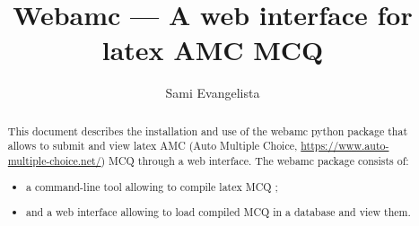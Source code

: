 \documentclass{article}
\title{Webamc \TOOLVERSION{} --- A web interface for latex AMC MCQ}
\author{Sami Evangelista}
\begin{document}
\maketitle
%
\begin{abstract}
  This document describes the installation and use of the webamc
  python package that allows to submit and view latex AMC (Auto
  Multiple Choice, \url{https://www.auto-multiple-choice.net/}) MCQ
  through a web interface. The webamc package consists of:
  \begin{itemize}
  \item a command-line tool allowing to compile latex MCQ ;
  \item and a web interface allowing to load compiled MCQ in a database
    and view them.
  \end{itemize}
\end{abstract}
%
\tableofcontents
{}
\end{document}
